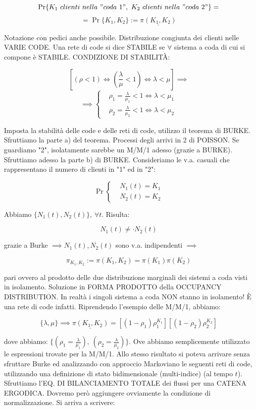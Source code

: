 \[
	\Pr\{K_1\ clienti\ nella\ "coda\ 1",\ K_2\ clienti\ nella\ "coda\ 2"\} =
\]
\[
	= \Pr\{K_1,K_2\} := \underline{\pi(K_1,K_2)}
\]

Notazione con pedici anche possibile. Distribuzione congiunta dei clienti nelle VARIE CODE. Una rete di code si dice STABILE se $\forall$ sistema a coda di cui si compone è STABILE. CONDIZIONE DI STABILIT\`A:

\[	
	[(\rho<1) \iff (\frac{\lambda}{\mu} < 1) \iff \lambda<\mu] \implies
\]
\[
	\implies
	\left\{
	\begin{aligned}
	&\rho_1=\frac{\lambda}{\mu_1} < 1 \iff \lambda<\mu_1\\
	&\rho_2=\frac{\lambda}{\mu_2} < 1 \iff \lambda<\mu_2
	\end{aligned}
	\right.
\]

Imposta la stabilità delle code e delle reti di code, utilizzo il teorema di BURKE. Sfruttiamo la parte a) del teorema. Processi degli arrivi in 2 di POISSON. Se guardiamo "2", isolatamente sarebbe un M/M/1 adesso (grazie a BURKE). Sfruttiamo adesso la parte b) di BURKE. Consideriamo le v.a. casuali che rappresentano il numero di clienti in "1" ed in "2":

\[
	\Pr\left\{
	\begin{aligned}
	&N_1(t) = K_1\\
	&N_2(t) = K_2
	\end{aligned}
	\right.
\]

Abbiamo $\{N_1(t),N_2(t)\},\ \forall t$. Risulta:

\[
	N_1(t) \neq \mathord{\cdot} N_2(t)
\]

grazie a Burke $\implies N_1(t),N_2(t)$ sono v.a. indipendenti $\implies$

\[
	\pi_{K_1,K_2} := \pi(K_1,K_2) = \pi(K_1)\pi(K_2)
\]

pari ovvero al prodotto delle due distribuzione marginali dei sistemi a coda visti in isolamento. Soluzione in FORMA PRODOTTO della OCCUPANCY DISTRIBUTION. In realtà i singoli sistema a coda NON stanno in isolamento! \`E una rete di code infatti. Riprendendo l'esempio delle M/M/1, abbiamo:

\[
	\{\lambda,\mu\} \implies \underline{\pi(K_1,K_2)} = [(1-\rho_1)\rho_1^{K_1}][(1-\rho_2)\rho_2^{K_2}]
\]

dove abbiamo: $\{(\rho_1=\frac{\lambda}{\mu_1}),\ (\rho_2=\frac{\lambda}{\mu_2})\}$. Ove abbiamo semplicemente utilizzato le espressioni trovate per la M/M/1. Allo stesso risultato si poteva arrivare senza sfruttare Burke ed analizzando con approccio Markoviano le seguenti reti di code, utilizzando una definizione di stato bidimensionale (multi-indice) (al tempo $t$). Sfruttiamo l'EQ. DI BILANCIAMENTO TOTALE dei flussi per una CATENA ERGODICA. Dovremo però aggiungere ovviamente la condizione di normalizzazione. Si arriva a scrivere:

